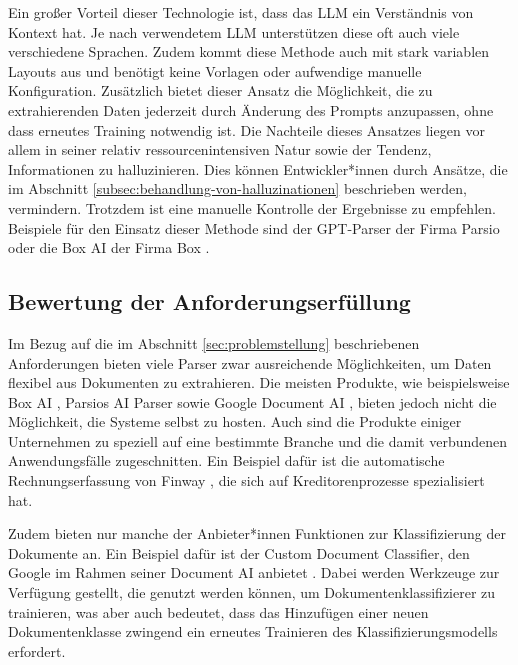 Ein großer Vorteil dieser Technologie ist, dass das \gls{LLM} ein Verständnis von Kontext hat. Je nach verwendetem \gls{LLM} unterstützen diese oft auch viele verschiedene Sprachen. Zudem kommt diese Methode auch mit stark variablen Layouts aus und benötigt keine Vorlagen oder aufwendige manuelle Konfiguration. Zusätzlich bietet dieser Ansatz die Möglichkeit, die zu extrahierenden Daten jederzeit durch Änderung des Prompts anzupassen, ohne dass erneutes Training notwendig ist. Die Nachteile dieses Ansatzes liegen vor allem in seiner relativ ressourcenintensiven Natur sowie der Tendenz, Informationen zu halluzinieren. Dies können Entwickler*innen durch Ansätze, die im Abschnitt \ref{subsec:behandlung-von-halluzinationen} beschrieben werden, vermindern. Trotzdem ist eine manuelle Kontrolle der Ergebnisse zu empfehlen. Beispiele für den Einsatz dieser Methode sind der GPT-Parser der Firma Parsio \parencite{parsio_pdf_extraction} oder die Box AI der Firma Box \parencite{box_ai}.

\subsection{Bewertung der Anforderungserfüllung}
\label{subsec:bewertung-im-bezug-auf-die-anforderungen}

Im Bezug auf die im Abschnitt \ref{sec:problemstellung} beschriebenen Anforderungen bieten viele Parser zwar ausreichende Möglichkeiten, um Daten flexibel aus Dokumenten zu extrahieren. Die meisten Produkte, wie beispielsweise Box AI \parencite{box_ai}, Parsios AI Parser \parencite{parsio_pdf_extraction} sowie Google Document AI \parencite{google_documentAI}, bieten jedoch nicht die Möglichkeit, die Systeme selbst zu hosten. Auch sind die Produkte einiger Unternehmen zu speziell auf eine bestimmte Branche und die damit verbundenen Anwendungsfälle zugeschnitten. Ein Beispiel dafür ist die automatische Rechnungserfassung von Finway \parencite{finway_automatische_rechnungserfassung}, die sich auf Kreditorenprozesse spezialisiert hat.

Zudem bieten nur manche der Anbieter*innen Funktionen zur Klassifizierung der Dokumente an. Ein Beispiel dafür ist der Custom Document Classifier, den Google im Rahmen seiner Document AI anbietet \parencite{google_documentAiCustomClassifier}. Dabei werden Werkzeuge zur Verfügung gestellt, die genutzt werden können, um Dokumentenklassifizierer zu trainieren, was aber auch bedeutet, dass das Hinzufügen einer neuen Dokumentenklasse zwingend ein erneutes Trainieren des Klassifizierungsmodells erfordert.

